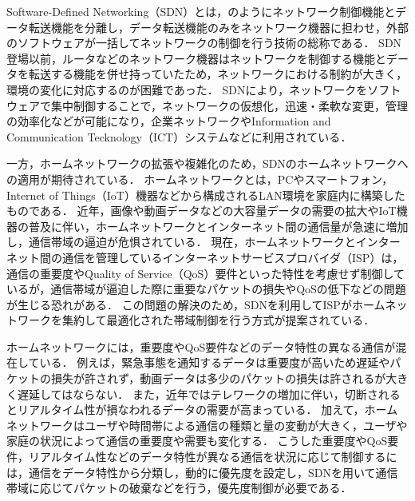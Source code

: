 \documentclass[a4paper,11pt,uplatex]{ujreport}
\begin{document}
  Software-Defined Networking（SDN）とは，のようにネットワーク制御機能とデータ転送機能を分離し，データ転送機能のみをネットワーク機器に担わせ，外部のソフトウェアが一括してネットワークの制御を行う技術の総称である．
  SDN登場以前，ルータなどのネットワーク機器はネットワークを制御する機能とデータを転送する機能を併せ持っていたため，ネットワークにおける制約が大きく，環境の変化に対応するのが困難であった．
  SDNにより，ネットワークをソフトウェアで集中制御することで，ネットワークの仮想化，迅速・柔軟な変更，管理の効率化などが可能になり，企業ネットワークやInformation and Communication Tecknology（ICT）システムなどに利用されている\cite{NEC}．\par
  一方，ホームネットワークの拡張や複雑化のため，SDNのホームネットワークへの適用が期待されている．
  ホームネットワークとは，PCやスマートフォン，Internet of Things（IoT）機器などから構成されるLAN環境を家庭内に構築したものである．
  近年，画像や動画データなどの大容量データの需要の拡大やIoT機器の普及に伴い，ホームネットワークとインターネット間の通信量が急速に増加し，通信帯域の逼迫が危惧されている\cite{ガイドライン}．
  現在，ホームネットワークとインターネット間の通信を管理しているインターネットサービスプロバイダ（ISP）は，通信の重要度やQuality of Service（QoS）要件といった特性を考慮せず制御しているが，通信帯域が逼迫した際に重要なパケットの損失やQoSの低下などの問題が生じる恐れがある．
  この問題の解決のため，SDNを利用してISPがホームネットワークを集約して最適化された帯域制御を行う方式が提案されている\cite{Framework}．\par
  ホームネットワークには，重要度やQoS要件などのデータ特性の異なる通信が混在している．
  例えば，緊急事態を通知するデータは重要度が高いため遅延やパケットの損失が許されず，動画データは多少のパケットの損失は許されるが大きく遅延してはならない．
  また，近年ではテレワークの増加に伴い，切断されるとリアルタイム性が損なわれるデータの需要が高まっている．
  加えて，ホームネットワークはユーザや時間帯による通信の種類と量の変動が大きく，ユーザや家庭の状況によって通信の重要度や需要も変化する．
  こうした重要度やQoS要件，リアルタイム性などのデータ特性が異なる通信を状況に応じて制御するには，通信をデータ特性から分類し，動的に優先度を設定し，SDNを用いて通信帯域に応じてパケットの破棄などを行う，優先度制御が必要である．
\end{document}
